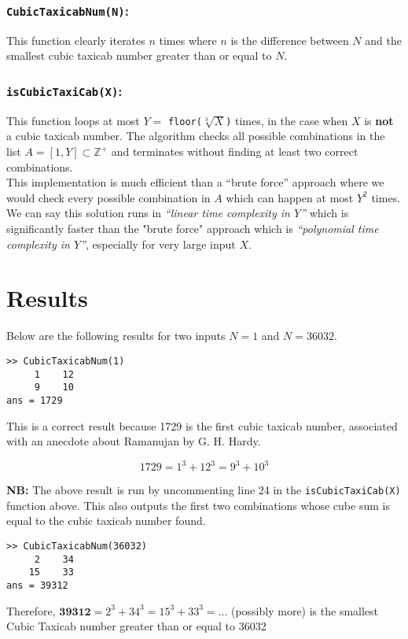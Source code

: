 \documentclass[11pt]{report}
\begin{document}
\subsubsection{\texttt{CubicTaxicabNum(N)}:}
This function clearly iterates $n$ times where $n$ is the difference between $N$ and the smallest cubic taxicab number greater than or equal to $N$.

\subsubsection{\texttt{isCubicTaxiCab(X)}:}
This function loops at most $Y=$ \texttt{floor($\sqrt[3]{X}$)} times, in the case when $X$ is \textbf{not} a cubic taxicab number. The algorithm checks all possible combinations in the list $A=[1,Y]\subset\mathbb{Z^+}$ and terminates without finding at least two correct combinations. \\

This implementation is much efficient than a ``brute force'' approach where we would check every possible combination in $A$ which can happen at most $Y^2$ times. \\

We can say this solution runs in \textit{``linear time complexity in $Y$''} which is significantly faster than the "brute force" approach which is \textit{``polynomial time complexity in $Y$''}, especially for very large input $X$.
\section{Results}
Below are the following results for two inputs $N=1$ and $N=36032$. \\

\begin{lstlisting}[title={N=1}]
>> CubicTaxicabNum(1)
     1    12
     9    10
ans = 1729
\end{lstlisting}

This is a correct result because 1729 is the first cubic taxicab number, associated with an anecdote about Ramanujan by G. H. Hardy.

\begin{equation*}
	1729 = 1^3 + 12^3 = 9^3 + 10^3
\end{equation*}

\textbf{NB:} The above result is run by uncommenting line 24 in the \texttt{isCubicTaxiCab(X)} function above. This also outputs the first two combinations whose cube sum is equal to the cubic taxicab number found. \\
\begin{lstlisting}[title={N=36032}]
>> CubicTaxicabNum(36032)
     2    34
    15    33
ans = 39312
\end{lstlisting}
Therefore, $\textbf{39312} = 2^3 +34^3 = 15^3 + 33^3 = ...$ (possibly more) is the smallest Cubic Taxicab number greater than or equal to 36032
\end{document}
